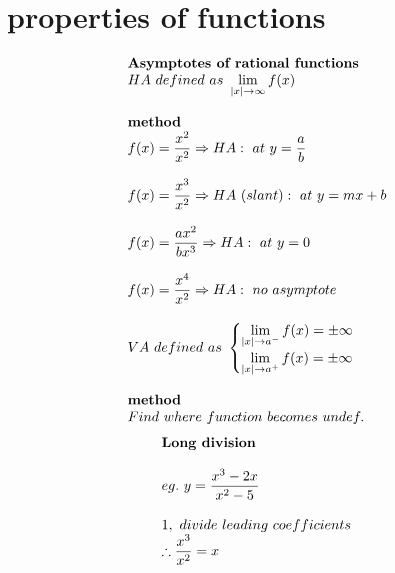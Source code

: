 \documentclass{article}
\begin{document}
\newpage

\section{properties of functions}

\setlength{\columnsep}{4cm}
\begin{multicols}{2}
    \[
    \begin{array}{>{\displaystyle}l}
        \textbf{Asymptotes\ of\ rational\ functions}\\
        HA\ defined\ as\ \lim _{|x|\rightarrow \infty } f( x)\\
        \\
        \mathbf{method\ }\\
        f( x) =\frac{x^{2}}{x^{2}} \Rightarrow HA:\ at\ y=\frac{a}{b}\\
        \\
        f( x) =\frac{x^{3}}{x^{2}} \Rightarrow HA\ ( slant) :\ at\ y=mx+b\ \\
        \\
        f( x) =\frac{ax^{2}}{bx^{3}} \Rightarrow HA:\ at\ y=0\\
        \\
        f( x) =\frac{x^{4}}{x^{2}} \Rightarrow HA:\ no\ asymptote\\\ 
        \\
        VA\ defined\ as\ 
        \begin{cases}
        \displaystyle \lim _{|x|\rightarrow a^{-}} f( x) =\pm \infty \\
        \displaystyle \lim _{|x|\rightarrow a^{+}} f( x) =\pm \infty 
        \end{cases}\\
        \\
        \mathbf{method\ }\\
        Find\ where\ function\ becomes\ undef.\ 
    \end{array}
    \]
    \columnbreak
    \noindent 
    \[
    \begin{array}{>{\displaystyle}l}
        \textbf{Long\ division} \\
        \\
        eg.\ y=\frac{x^{3} -2x}{x^{2} -5}\\
        \\
        1,\ divide\ leading\ coefficients\ \\
        \therefore \frac{x^{3}}{x^{2}} =x\\
        \\

\end{array}\]
\end{multicols}
\end{document}

